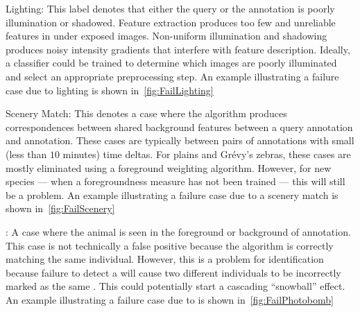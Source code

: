 \begin{itemln}
                \FailQuality{}

            \item Lighting:
            This label denotes that either the query or the \groundtrue{} annotation is poorly illumination or
              shadowed.
            Feature extraction produces too few and unreliable features in under exposed images.
            Non-uniform illumination and shadowing produces noisy intensity gradients that interfere with feature
              description.
            Ideally, a classifier could be trained to determine which images are poorly illuminated and select an
              appropriate preprocessing step.
            An example illustrating a failure case due to lighting is shown in~\cref{fig:FailLighting}

                \FailLighting{}

            \item Scenery Match:
            This denotes a case where the algorithm produces correspondences between shared background features
              between a query annotation and \aan{\groundfalse{}} annotation.
            These cases are typically between pairs of annotations with small (less than $10$ minutes) time
              deltas.
            For plains and Grévy's zebras, these cases are mostly eliminated using a foreground weighting
              algorithm.
            However, for new species --- when a foregroundness measure has not been trained --- this will still
              be a problem.
            An example illustrating a failure case due to a scenery match is shown in~\cref{fig:FailScenery}

              \FailScenery{}

            \item \Photobomb{}:
            A case where the \groundtrue{} animal is seen in the foreground or background of \aan{\groundfalse{}}
              annotation.
            This case is not technically a false positive because the algorithm is correctly matching the same
              individual.
            However, this is a problem for identification because failure to detect a \photobomb{} will cause two
              different individuals to be incorrectly marked as the same \name{}.
            This could potentially start a cascading ``snowball'' effect.
            An example illustrating a failure case due to \photobombing{} is shown in~\cref{fig:FailPhotobomb}

              \FailPhotobomb{}

        \end{itemln}


